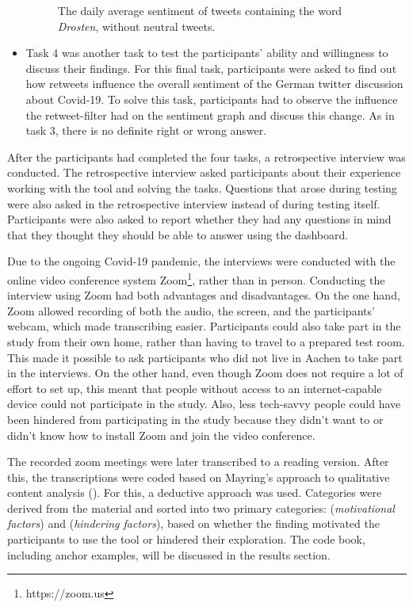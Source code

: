 \begin{itemize}
\begin{figure}[htb]
        \caption{The daily average sentiment of tweets containing the word \emph{Drosten}, without neutral tweets.}
        \label{fig:sentiment_drosten_noneutral}
    \end{figure}
    \item Task 4 was another task to test the participants' ability and willingness to discuss their findings.
    For this final task, participants were asked to find out how retweets influence the overall sentiment of the German twitter discussion about Covid-19. To solve this task, participants had to observe the influence the retweet-filter had on the sentiment graph and discuss this change. As in task 3, there is no definite right or wrong answer.
\end{itemize}

After the participants had completed the four tasks, a retrospective interview was conducted. The retrospective interview asked participants about their experience working with the tool and solving the tasks. Questions that arose during testing were also asked in the retrospective interview instead of during testing itself. Participants were also asked to report whether they had any questions in mind that they thought they should be able to answer using the dashboard.

Due to the ongoing Covid-19 pandemic, the interviews were conducted with the online video conference system Zoom\footnote{https://zoom.us}, rather than in person. Conducting the interview using Zoom had both advantages and disadvantages. On the one hand, Zoom allowed recording of both the audio, the screen, and the participants' webcam, which made transcribing easier. Participants could also take part in the study from their own home, rather than having to travel to a prepared test room. This made it possible to ask participants who did not live in Aachen to take part in the interviews.
On the other hand, even though Zoom does not require a lot of effort to set up, this meant that people without access to an internet-capable device could not participate in the study. Also, less tech-savvy people could have been hindered from participating in the study because they didn't want to or didn't know how to install Zoom and join the video conference.

The recorded zoom meetings were later transcribed to a reading version. After this, the transcriptions were coded based on Mayring's approach to qualitative content analysis (\cite{mayring2010qualitative}). For this, a deductive approach was used. Categories were derived from the material and sorted into two primary categories:  (\emph{motivational factors}) and  (\emph{hindering factors}), based on whether the finding motivated the participants to use the tool or hindered their exploration. The code book, including anchor examples, will be discussed in the results section. 

